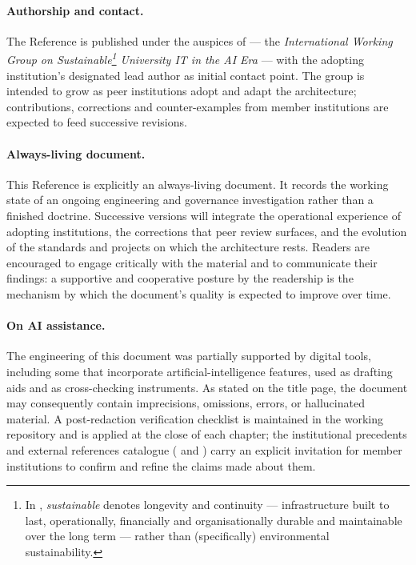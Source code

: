\paragraph{Authorship and contact.} The Reference is published
under the auspices of  --- the
\emph{International Working Group on Sustainable\footnote{In
, \emph{sustainable} denotes longevity and continuity
--- infrastructure built to last, operationally, financially and
organisationally durable and maintainable over the long term ---
rather than (specifically) environmental sustainability.} University
IT in the AI Era} --- with the adopting institution's designated lead
author as initial contact point. The
group is intended to grow as peer institutions adopt and adapt
the architecture; contributions, corrections and counter-examples
from member institutions are expected to feed successive
revisions.

\paragraph{Always-living document.} This Reference is explicitly
an always-living document. It records the working state of an
ongoing engineering and governance investigation rather than a
finished doctrine. Successive versions will integrate the
operational experience of adopting institutions, the corrections
that peer review surfaces, and the evolution of the standards and
projects on which the architecture rests. Readers are encouraged
to engage critically with the material and to communicate their
findings: a supportive and cooperative posture by the readership
is the mechanism by which the document's quality is expected to
improve over time.

\paragraph{On AI assistance.} The engineering of this document
was partially supported by digital tools, including some that
incorporate artificial-intelligence features, used as drafting
aids and as cross-checking instruments. As stated on the title
page, the document may consequently contain imprecisions,
omissions, errors, or hallucinated material. A post-redaction
verification checklist is maintained in the working repository
and is applied at the close of each chapter; the institutional
precedents and external references catalogue
( and
) carry an explicit invitation
for member institutions to confirm and refine the claims made
about them.
